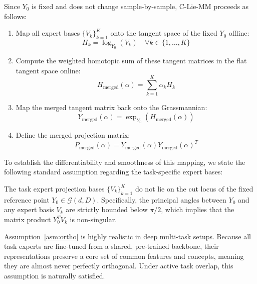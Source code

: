 Since $Y_0$ is fixed and does not change sample-by-sample, C-Lie-MM proceeds as follows:
\begin{enumerate}
    \item Map all expert bases $\{V_k\}_{k=1}^K$ onto the tangent space of the fixed $Y_0$ offline:
    \begin{equation}
        H_k = \log_{Y_0}(V_k) \quad \forall k \in \{1, \dots, K\}
    \end{equation}
    \item Compute the weighted homotopic sum of these tangent matrices in the flat tangent space online:
    \begin{equation}
        H_{\text{merged}}(\alpha) = \sum_{k=1}^K \alpha_k H_k
    \end{equation}
    \item Map the merged tangent matrix back onto the Grassmannian:
    \begin{equation}
        Y_{\text{merged}}(\alpha) = \exp_{Y_0}\left(H_{\text{merged}}(\alpha)\right)
    \end{equation}
    \item Define the merged projection matrix:
    \begin{equation}
        P_{\text{merged}}(\alpha) = Y_{\text{merged}}(\alpha) Y_{\text{merged}}(\alpha)^T
    \end{equation}
\end{enumerate}

To establish the differentiability and smoothness of this mapping, we state the following standard assumption regarding the task-specific expert bases:

\begin{assumption}
\label{asm:ortho}
The task expert projection bases $\{V_k\}_{k=1}^K$ do not lie on the cut locus of the fixed reference point $Y_0 \in \mathcal{G}(d, D)$. Specifically, the principal angles between $Y_0$ and any expert basis $V_k$ are strictly bounded below $\pi/2$, which implies that the matrix product $Y_0^T V_k$ is non-singular.
\end{assumption}

Assumption~\ref{asm:ortho} is highly realistic in deep multi-task setups. Because all task experts are fine-tuned from a shared, pre-trained backbone, their representations preserve a core set of common features and concepts, meaning they are almost never perfectly orthogonal. Under active task overlap, this assumption is naturally satisfied.


